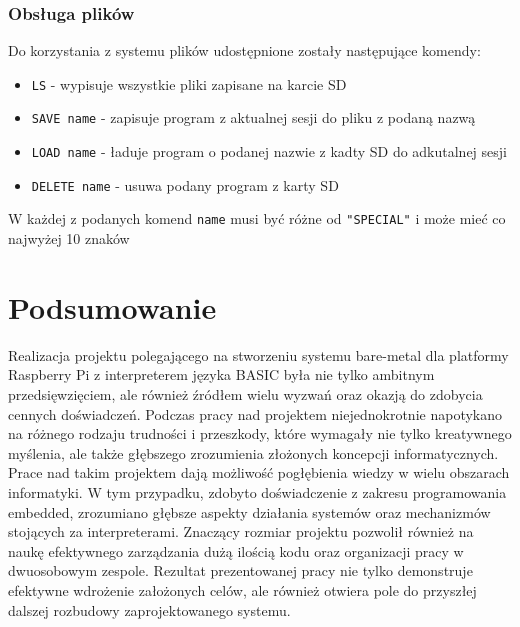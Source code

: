 \documentclass[shortabstract]{iithesis}
\begin{document}
\subsection{Obsługa plików}
Do korzystania z systemu plików udostępnione zostały następujące komendy: 
\begin{itemize}
 \item \texttt{LS} - wypisuje wszystkie pliki zapisane na karcie SD
 \item \texttt{SAVE name} - zapisuje program z aktualnej sesji do pliku z podaną nazwą
 \item \texttt{LOAD name} - ładuje program o podanej nazwie z kadty SD do adkutalnej sesji
 \item \texttt{DELETE name} - usuwa podany program z karty SD
\end{itemize}
W każdej z podanych komend \texttt{name} musi być różne od \texttt{"SPECIAL"} i może mieć co najwyżej 10 znaków


\chapter{Podsumowanie}
Realizacja projektu polegającego na stworzeniu systemu bare-metal dla platformy Raspberry Pi z interpreterem języka BASIC była nie tylko ambitnym przedsięwzięciem, ale również źródłem wielu wyzwań oraz okazją do zdobycia cennych doświadczeń. Podczas pracy nad projektem niejednokrotnie napotykano na różnego rodzaju trudności i przeszkody, które wymagały nie tylko kreatywnego myślenia, ale także głębszego zrozumienia złożonych koncepcji informatycznych.
Prace nad takim projektem dają możliwość pogłębienia wiedzy w wielu obszarach informatyki. W tym przypadku, zdobyto doświadczenie z zakresu programowania embedded, zrozumiano głębsze aspekty działania systemów oraz mechanizmów stojących za interpreterami. Znaczący rozmiar projektu pozwolił również na naukę efektywnego zarządzania dużą ilością kodu oraz organizacji pracy w dwuosobowym zespole.
Rezultat prezentowanej pracy nie tylko demonstruje efektywne wdrożenie założonych celów, ale również otwiera pole do przyszłej dalszej rozbudowy zaprojektowanego systemu. 
\end{document}
